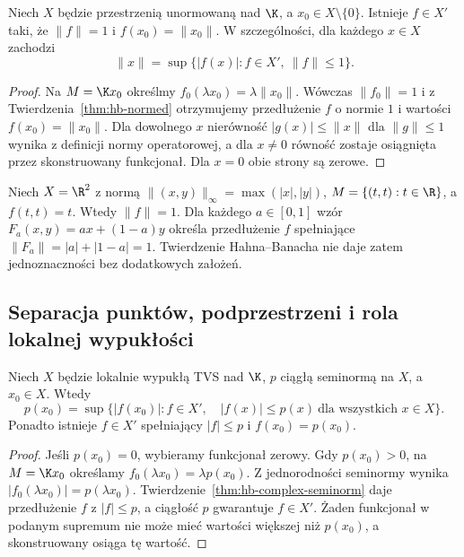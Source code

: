 \begin{wniosek}\label{cor:norming}
Niech $X$ będzie przestrzenią unormowaną nad $\K$,
a $x_0\in X\setminus\{0\}$. Istnieje $f\in X'$
taki, że $\|f\|=1$ i $f(x_0)=\|x_0\|$.
W szczególności, dla każdego $x\in X$ zachodzi
\[
 \|x\|=\sup\bigl\{|f(x)|:f\in X',\ \|f\|\le1\bigr\}.
\]
\end{wniosek}
\begin{proof}
Na $M=\K x_0$ określmy
$f_0(\lambda x_0)=\lambda\|x_0\|$.
Wówczas $\|f_0\|=1$ i z
Twierdzenia~\ref{thm:hb-normed} otrzymujemy przedłużenie
$f$ o normie $1$ i wartości $f(x_0)=\|x_0\|$.
Dla dowolnego $x$ nierówność $|g(x)|\le\|x\|$
dla $\|g\|\le1$ wynika z definicji normy operatorowej,
a dla $x\ne0$ równość zostaje osiągnięta przez
skonstruowany funkcjonał. Dla $x=0$ obie strony są zerowe.
\end{proof}

\begin{przyklad}
Niech $X=\R^2$ z normą $\|(x,y)\|_\infty
=\max(|x|,|y|)$, $M=\{(t,t):t\in\R\}$, a
$f(t,t)=t$. Wtedy $\|f\|=1$. Dla każdego
$a\in[0,1]$ wzór
$F_a(x,y)=a x+(1-a)y$ określa przedłużenie $f$
spełniające $\|F_a\|=|a|+|1-a|=1$.
Twierdzenie Hahna--Banacha nie daje zatem
jednoznaczności bez dodatkowych założeń.
\end{przyklad}

\subsection{Separacja punktów, podprzestrzeni i rola lokalnej wypukłości}

\begin{twierdzenie}
\label{thm:seminorm-as-sup}
Niech $X$ będzie lokalnie wypukłą TVS nad $\K$,
$p$ ciągłą seminormą na $X$, a $x_0\in X$.
Wtedy
\[
 p(x_0)=\sup\bigl\{|f(x_0)|:f\in X',\quad
 |f(x)|\le p(x)\ \text{dla wszystkich }x\in X\bigr\}.
\]
Ponadto istnieje $f\in X'$ spełniający $|f|\le p$
i $f(x_0)=p(x_0)$.
\end{twierdzenie}
\begin{proof}
Jeśli $p(x_0)=0$, wybieramy funkcjonał zerowy.
Gdy $p(x_0)>0$, na $M=\K x_0$ określamy
$f_0(\lambda x_0)=\lambda p(x_0)$.
Z jednorodności seminormy wynika
$|f_0(\lambda x_0)|=p(\lambda x_0)$.
Twierdzenie~\ref{thm:hb-complex-seminorm} daje
przedłużenie $f$ z $|f|\le p$, a ciągłość $p$
gwarantuje $f\in X'$. Żaden funkcjonał w podanym
supremum nie może mieć wartości większej niż $p(x_0)$,
a skonstruowany osiąga tę wartość.
\end{proof}

